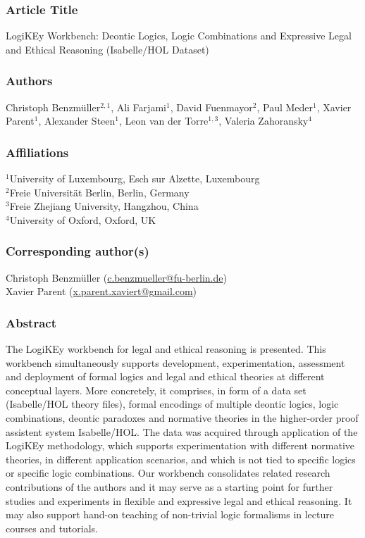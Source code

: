 \documentclass{article}
\newcommand{\comment}[1]{
}
\begin{document}
\subsubsection*{Article Title}
LogiKEy Workbench: Deontic Logics, Logic Combinations and Expressive Legal and Ethical Reasoning (Isabelle/HOL Dataset)

\subsubsection*{Authors}
Christoph Benzmüller$^{2,1}$, Ali Farjami$^{1}$, David
Fuenmayor$^{2}$, Paul Meder$^{1}$, Xavier Parent$^{1}$, Alexander
Steen$^{1}$, Leon van der Torre$^{1,3}$, Valeria Zahoransky$^{4}$

\subsubsection*{Affiliations}
$^{1}$University of Luxembourg, Esch sur Alzette, Luxembourg\\
$^{2}$Freie Universität Berlin, Berlin, Germany \\
$^{3}$Freie Zhejiang University, Hangzhou, China \\
$^{4}$University of Oxford, Oxford, UK\\

\subsubsection*{Corresponding author(s)}
Christoph Benzmüller (\url{c.benzmueller@fu-berlin.de}) \\
Xavier Parent (\url{x.parent.xaviert@gmail.com}) 

\comment{
[Firstname Lastname (email@address) – institutional email address preferred]
}


\subsubsection*{Abstract}
The LogiKEy workbench for 
legal and ethical reasoning is presented. This workbench
simultaneously supports development, experimentation, assessment and
deployment of formal logics and legal and ethical theories at
different conceptual layers. 
More concretely, it comprises, in form of a data set (Isabelle/HOL theory
files), formal encodings of multiple deontic logics, logic
combinations, deontic paradoxes and normative theories in the
higher-order proof assistent system Isabelle/HOL.  The data was
acquired through application of the LogiKEy methodology, which
supports experimentation with different normative theories, in
different application scenarios, and which is not tied to specific
logics or specific logic combinations.  Our workbench consolidates
related research contributions of the authors and it may serve as a
starting point for further studies and experiments in flexible and
expressive legal and ethical reasoning. It may also support hand-on
teaching of non-trivial logic formalisms in lecture courses and
tutorials.
\end{document}
